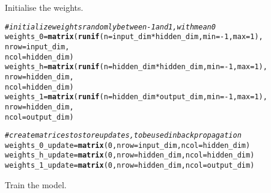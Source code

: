 \documentclass[english,article]{article}\usepackage[]{graphicx}\usepackage[]{color}
\makeatletter
\newcommand{\hlnum}[1]{\textcolor[rgb]{0.686,0.059,0.569}{#1}}%
\newcommand{\hlcom}[1]{\textcolor[rgb]{0.678,0.584,0.686}{\textit{#1}}}%
\newcommand{\hlopt}[1]{\textcolor[rgb]{0,0,0}{#1}}%
\newcommand{\hlstd}[1]{\textcolor[rgb]{0.345,0.345,0.345}{#1}}%
\newcommand{\hlkwb}[1]{\textcolor[rgb]{0.69,0.353,0.396}{#1}}%
\newcommand{\hlkwc}[1]{\textcolor[rgb]{0.333,0.667,0.333}{#1}}%
\newcommand{\hlkwd}[1]{\textcolor[rgb]{0.737,0.353,0.396}{\textbf{#1}}}%
\newenvironment{kframe}{%
 \def\at@end@of@kframe{}%
 \ifinner\ifhmode%
  \def\at@end@of@kframe{\end{minipage}}%
  \begin{minipage}{\columnwidth}%
 \fi\fi%
 \def\FrameCommand##1{\hskip\@totalleftmargin \hskip-\fboxsep
 \colorbox{shadecolor}{##1}\hskip-\fboxsep
     \hskip-\linewidth \hskip-\@totalleftmargin \hskip\columnwidth}%
 \MakeFramed {\advance\hsize-\width
   \@totalleftmargin\z@ \linewidth\hsize
   \@setminipage}}%
 {\par\unskip\endMakeFramed%
 \at@end@of@kframe}
\newenvironment{knitrout}{}{} %
\makeatother
\begin{document}
Initialise the weights.

\begin{knitrout}
\color{fgcolor}\begin{kframe}
\begin{alltt}
\hlcom{# initialize weights randomly between -1 and 1, with mean 0}
\hlstd{weights_0} \hlkwb{=} \hlkwd{matrix}\hlstd{(}\hlkwd{runif}\hlstd{(}\hlkwc{n} \hlstd{= input_dim} \hlopt{*}\hlstd{hidden_dim,} \hlkwc{min}\hlstd{=}\hlopt{-}\hlnum{1}\hlstd{,} \hlkwc{max}\hlstd{=}\hlnum{1}\hlstd{),}
                   \hlkwc{nrow}\hlstd{=input_dim,}
                   \hlkwc{ncol}\hlstd{=hidden_dim )}
\hlstd{weights_h} \hlkwb{=} \hlkwd{matrix}\hlstd{(}\hlkwd{runif}\hlstd{(}\hlkwc{n} \hlstd{= hidden_dim}\hlopt{*}\hlstd{hidden_dim,} \hlkwc{min}\hlstd{=}\hlopt{-}\hlnum{1}\hlstd{,} \hlkwc{max}\hlstd{=}\hlnum{1}\hlstd{),}
                   \hlkwc{nrow}\hlstd{=hidden_dim,}
                   \hlkwc{ncol}\hlstd{=hidden_dim )}
\hlstd{weights_1} \hlkwb{=} \hlkwd{matrix}\hlstd{(}\hlkwd{runif}\hlstd{(}\hlkwc{n} \hlstd{= hidden_dim}\hlopt{*}\hlstd{output_dim,} \hlkwc{min}\hlstd{=}\hlopt{-}\hlnum{1}\hlstd{,} \hlkwc{max}\hlstd{=}\hlnum{1}\hlstd{),}
                   \hlkwc{nrow}\hlstd{=hidden_dim,}
                   \hlkwc{ncol}\hlstd{=output_dim )}

\hlcom{# create matrices to store updates, to be used in backpropagation}
\hlstd{weights_0_update} \hlkwb{=} \hlkwd{matrix}\hlstd{(}\hlnum{0}\hlstd{,} \hlkwc{nrow} \hlstd{= input_dim,}  \hlkwc{ncol} \hlstd{= hidden_dim)}
\hlstd{weights_h_update} \hlkwb{=} \hlkwd{matrix}\hlstd{(}\hlnum{0}\hlstd{,} \hlkwc{nrow} \hlstd{= hidden_dim,} \hlkwc{ncol} \hlstd{= hidden_dim)}
\hlstd{weights_1_update} \hlkwb{=} \hlkwd{matrix}\hlstd{(}\hlnum{0}\hlstd{,} \hlkwc{nrow} \hlstd{= hidden_dim,} \hlkwc{ncol} \hlstd{= output_dim)}
\end{alltt}
\end{kframe}
\end{knitrout}

Train the model.
\end{document}
